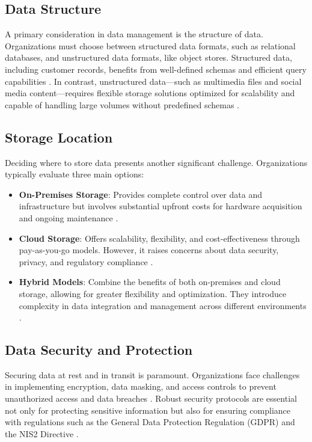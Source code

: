\documentclass{article}
\begin{document}
\subsection*{Data Structure}

A primary consideration in data management is the structure of data. Organizations must choose between structured data formats, such as relational databases, and unstructured data formats, like object stores. Structured data, including customer records, benefits from well-defined schemas and efficient query capabilities \cite{elmasri2016}. In contrast, unstructured data—such as multimedia files and social media content—requires flexible storage solutions optimized for scalability and capable of handling large volumes without predefined schemas \cite{gartner2019}.

\subsection*{Storage Location}

Deciding where to store data presents another significant challenge. Organizations typically evaluate three main options:

\begin{itemize}
    \item \textbf{On-Premises Storage}: Provides complete control over data and infrastructure but involves substantial upfront costs for hardware acquisition and ongoing maintenance \cite{idc2020}.
    \item \textbf{Cloud Storage}: Offers scalability, flexibility, and cost-effectiveness through pay-as-you-go models. However, it raises concerns about data security, privacy, and regulatory compliance \cite{csa2019, enisa2020}.
    \item \textbf{Hybrid Models}: Combine the benefits of both on-premises and cloud storage, allowing for greater flexibility and optimization. They introduce complexity in data integration and management across different environments \cite{ibm2020}.
\end{itemize}

\subsection*{Data Security and Protection}

Securing data at rest and in transit is paramount. Organizations face challenges in implementing encryption, data masking, and access controls to prevent unauthorized access and data breaches \cite{nist2020}. Robust security protocols are essential not only for protecting sensitive information but also for ensuring compliance with regulations such as the General Data Protection Regulation (GDPR) \cite{eu2016} and the NIS2 Directive \cite{nis2020}.
\end{document}
